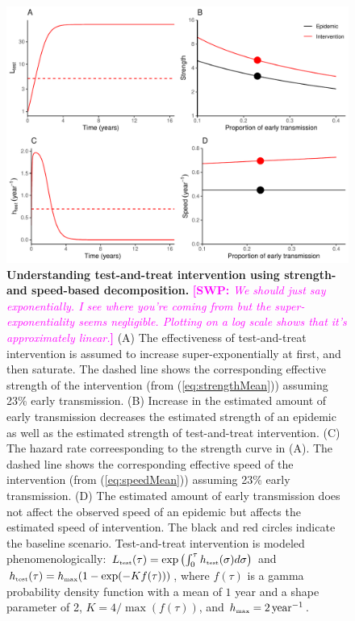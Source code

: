 \documentclass[12pt]{article}
\newcommand{\comment}[3]{\textcolor{#1}{\textbf{[#2: }\textit{#3}\textbf{]}}}
\newcommand{\swp}[1]{\comment{magenta}{SWP}{#1}}
\newcommand{\tsub}[2]{#1_{{\textrm{\tiny #2}}}}
\newcommand{\figlab}[1]{\label{fig:#1}}
\newcommand{\eqref}[1]{(\ref{eq:#1})}
\begin{document}
\begin{figure}[!t]
\includegraphics[width=\textwidth]{../figure/test_and_treat.pdf}
\caption{
\textbf{Understanding test-and-treat intervention using strength- and speed-based decomposition.}
\swp{We should just say exponentially. I see where you're coming from but the super-exponentiality seems negligible. Plotting on a log scale shows that it's approximately linear.}
(A) The effectiveness of test-and-treat intervention is assumed to increase super-exponentially at first, and then saturate. The dashed line shows the corresponding effective strength of the intervention (from \eqref{strengthMean}) assuming 23\% early transmission.
(B) Increase in the estimated amount of early transmission decreases the estimated strength of an epidemic as well as the estimated strength of test-and-treat intervention.
(C) The hazard rate correesponding to the strength curve in (A). 
The dashed line shows the corresponding effective speed of the intervention (from \eqref{speedMean}) assuming 23\% early transmission.
(D) The estimated amount of early transmission does not affect the observed speed of an epidemic but affects the estimated speed of intervention.
The black and red circles indicate the baseline scenario.
Test-and-treat intervention is modeled phenomenologically: $\tsub{L}{test}(\tau) = \exp\left(\int_0^\tau \tsub{h}{test}(\sigma) d\sigma \right)$ and $\tsub{h}{test}(\tau) = \tsub{h}{max} (1 - \exp(- K f(\tau)))$, where $f(\tau)$ is a gamma probability density function with a mean of $1$ year and a shape parameter of 2, $K = 4/\max(f(\tau))$, and $\tsub{h}{max} = 2\,\mathrm{year}^{-1}$.
}
\figlab{test}
\end{figure}
\end{document}
